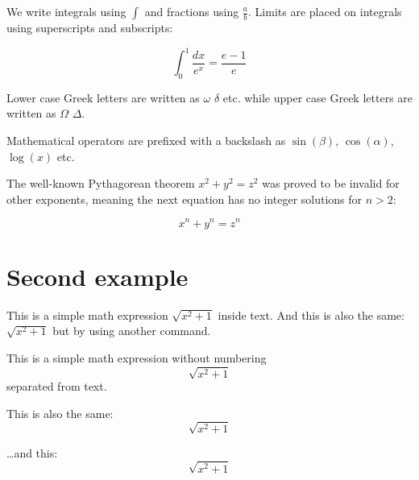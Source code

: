 \documentclass{article}
\begin{document}
We write integrals using $\int$ and fractions using $\frac{a}{b}$. Limits are placed on integrals using superscripts and subscripts:

\[ \int_0^1 \frac{dx}{e^x} =  \frac{e-1}{e} \]

Lower case Greek letters are written as $\omega$ $\delta$ etc. while upper case Greek letters are written as $\Omega$ $\Delta$.

Mathematical operators are prefixed with a backslash as $\sin(\beta)$, $\cos(\alpha)$, $\log(x)$ etc.


The well-known Pythagorean theorem \(x^2 + y^2 = z^2\) was proved to be invalid for other exponents, meaning the next equation has no integer solutions for \(n>2\):

\[ x^n + y^n = z^n \]

\section{Second example}

This is a simple math expression \(\sqrt{x^2+1}\) inside text. 
And this is also the same: 
\begin{math}
\sqrt{x^2+1}
\end{math}
but by using another command.

This is a simple math expression without numbering
\[\sqrt{x^2+1}\] 
separated from text.

This is also the same:
\begin{displaymath}
\sqrt{x^2+1}
\end{displaymath}

\ldots and this:
\begin{equation*}
\sqrt{x^2+1}
\end{equation*}
\end{document}
